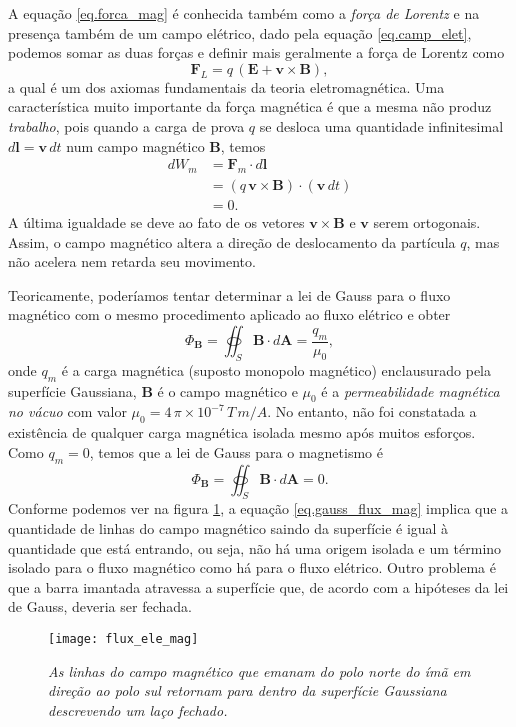 A equa\c{c}\~ao \ref{eq.forca_mag} \'e conhecida tamb\'em como a \textit{for\c{c}a de Lorentz} e na presen\c{c}a tamb\'em de um campo el\'etrico, dado pela equa\c{c}\~ao \ref{eq.camp_elet}, podemos somar as duas for\c{c}as e definir mais geralmente a for\c{c}a de Lorentz como
\begin{equation}\label{eq.forca_lorentz}
\textbf{F}_L=q\,(\mathbf{E}+\textbf{v}\times\textbf{B}),
\end{equation} 
a qual \'e um dos axiomas fundamentais da teoria eletromagn\'etica. Uma caracter\'istica muito importante da for\c{c}a magn\'etica \'e que a mesma n\~ao produz \textit{trabalho}, pois quando a carga de prova $q$ se desloca uma quantidade infinitesimal $d\mathbf{l}=\mathbf{v}\,dt$ num campo magn\'etico $\mathbf{B}$, temos 
\begin{align}\label{eq.trabalho_froca_mag}\nonumber
dW_m&=\mathbf{F}_m\cdot d\mathbf{l}\\\nonumber
&=(q\,\textbf{v}\times\textbf{B})\cdot(\mathbf{v}\,dt)\\
&=0.
\end{align}
A \'ultima igualdade se deve ao fato de os vetores $\mathbf{v}\times\mathbf{B}$ e $\mathbf{v}$ serem ortogonais. Assim, o campo magn\'etico altera a dire\c{c}\~ao de deslocamento da part\'icula $q$, mas n\~ao acelera nem retarda seu movimento.

Teoricamente, poderíamos tentar determinar a lei de Gauss para o fluxo magnético com o mesmo procedimento aplicado ao fluxo elétrico e obter
\begin{equation*}
\Phi_\textbf{B}=\oiint_S\textbf{B}\cdot\textit{d}\textbf{A}=\frac{q_m}{\mu_0},
\end{equation*} 
onde $q_m$ é a carga magnética (suposto monopolo magnético) enclausurado pela superfície Gaussiana, $\mathbf{B}$ é o campo magnético e $\mu_0$ é a \textit{permeabilidade magnética no vácuo} com valor $\mu_0=4\,\pi\times 10^{-7}\, T\,m/A$. No entanto, não foi constatada a existência de qualquer carga magnética isolada mesmo após muitos esforços. Como $q_m=0$, temos que a lei de Gauss para o magnetismo é
\begin{equation}\label{eq.gauss_flux_mag}
\Phi_\textbf{B}=\oiint_S\textbf{B}\cdot\textit{d}\textbf{A}=0.
\end{equation}
Conforme podemos ver na figura \ref{fig.flux_elet_magn}, a equação \ref{eq.gauss_flux_mag} implica que a quantidade de linhas do campo magnético saindo da superfície é igual à quantidade que está entrando, ou seja, não há uma origem isolada e um término isolado para o fluxo magnético como há para o fluxo elétrico. Outro problema é que a barra imantada atravessa a superfície que, de acordo com a hipóteses da lei de Gauss, deveria ser fechada.
\begin{figure}[!htb]
\centering
\texttt{[image: flux\_ele\_mag]}
\caption{\textit{As linhas do campo magnético que emanam do polo norte do ímã em direção ao polo sul retornam para dentro da superfície Gaussiana descrevendo um laço fechado.}}
\label{fig.flux_elet_magn}
\end{figure}

